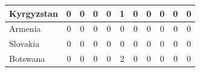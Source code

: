 \documentclass[12pt]{article}  %
\begin{document}
\begin{subappendices}
\begin{longtable}{|l|c|c|c|c|c|c|c|c|c|c|}
	\hline
	Kyrgyzstan                                                     & 0                                                                      & 0                                                                      & 0                                                                      & 0                                                                      & 1                                                                      & 0                                                                      & 0                         & 0                           & 0                           & 0                           \\ 
	\hline
	Armenia                                                        & 0                                                                      & 0                                                                      & 0                                                                      & 0                                                                      & 0                                                                      & 0                                                                      & 0                         & 0                           & 0                           & 0                           \\ 
	\hline
	Slovakia                                                       & 0                                                                      & 0                                                                      & 0                                                                      & 0                                                                      & 0                                                                      & 0                                                                      & 0                         & 0                           & 0                           & 0                           \\ 
	\hline
	Botswana                                                       & 0                                                                      & 0                                                                      & 0                                                                      & 0                                                                      & 2                                                                      & 0                                                                      & 0                         & 0                           & 0                           & 0                           \\ 

\end{longtable}
\end{subappendices}
\end{document}
